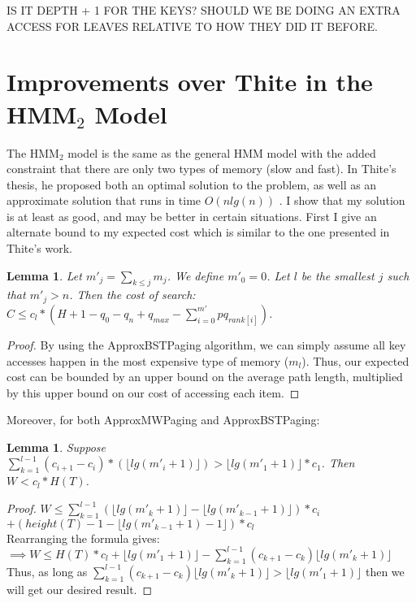 \documentclass[letterpaper,12pt,titlepage,oneside,final]{book}
\theoremstyle{plain}
\newtheorem{lem}[thm]{Lemma}
\begin{document}
IS IT DEPTH + 1 FOR THE KEYS?
SHOULD WE BE DOING AN EXTRA ACCESS FOR LEAVES RELATIVE TO HOW THEY DID IT BEFORE.


\section{Improvements over Thite in the HMM$_2$ Model}

The HMM$_2$ model is the same as the general HMM model with the added constraint that there are only two types of memory (slow and fast). In Thite's thesis, he proposed both an optimal solution to the problem, as well as an approximate solution that runs in time $O(n lg(n))$ \cite{thite2008optimum}. I show that my solution is at least as good, and may be better in certain situations. First I give an alternate bound to my expected cost which is similar to the one presented in Thite's work.

\begin{lem}
Let $m'_j = \sum_{k \leq j} m_j$. We define $m'_0 = 0$. Let $l$ be the smallest $j$ such that $m'_j > n$. Then the cost of search: \\
$C \leq  c_l * (H + 1 - q_0 - q_n + q_{max} - \sum_{i=0}^{m'} pq_{rank[i]})$.
\end{lem}

\begin{proof}
By using the ApproxBSTPaging algorithm, we can simply assume all key accesses happen in the most expensive type of memory ($m_l$). Thus, our expected cost can be bounded by an upper bound on the average path length, multiplied by this upper bound on our cost of accessing each item.
\end{proof}

Moreover, for both ApproxMWPaging and ApproxBSTPaging:\\
\begin{lem}
Suppose $\sum_{k=1}^{l-1} (c_{i+1}-c_i)*(\lfloor lg(m'_i+1) \rfloor) > \lfloor lg(m'_1+1) \rfloor*c_1$. Then \\
 $W < c_l*H(T)$. 
\end{lem}

\begin{proof}
$W \leq \sum_{k=1}^{l-1} (\lfloor lg(m'_k+1) \rfloor - \lfloor lg(m'_{k-1}+1) \rfloor)*c_i$\\ $+ (height(T) - 1 - \lfloor lg(m'_{k-1}+1)-1 \rfloor)*c_l$ \\
Rearranging the formula gives: \\
$\implies W \leq H(T)*c_l + \lfloor lg(m'_1+1) \rfloor - \sum_{k=1}^{l-1} (c_{k+1}-c_k)\lfloor lg(m'_k+1) \rfloor $\\
Thus, as long as $\sum_{k=1}^{l-1} (c_{k+1}-c_k)\lfloor lg(m'_k+1) \rfloor > \lfloor lg(m'_1+1) \rfloor$ then we will get our desired result.

\end{proof}
\end{document}
